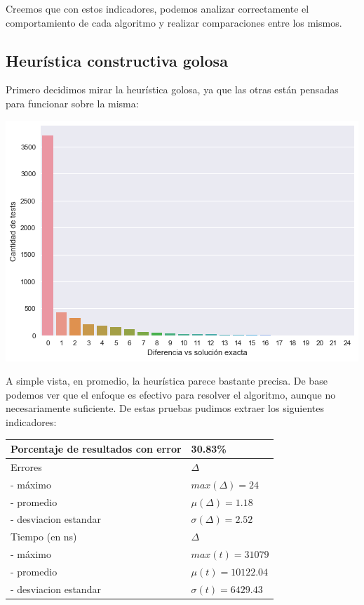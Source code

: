 Creemos que con estos indicadores, podemos analizar correctamente el comportamiento de cada algoritmo y realizar comparaciones entre los mismos.

\subsection*{Heurística constructiva golosa}

Primero decidimos mirar la heurística golosa, ya que las otras están pensadas para funcionar sobre la misma:

\begin{center}
    \includegraphics[scale=0.6]{img/accuracy-greedy.png}
\end{center}

A simple vista, en promedio, la heurística parece bastante precisa. De base podemos ver que el enfoque es efectivo para resolver el algoritmo, aunque no necesariamente suficiente. De estas pruebas pudimos extraer los siguientes indicadores:

\begin{center}
    \begin{tabular}{ | l l |}
        \hline
        Porcentaje de resultados con error & 30.83\% \\ \hline
        Errores & $\Delta$ \\
        - máximo & $max(\Delta) = 24$ \\
        - promedio & $\mu(\Delta) = 1.18$ \\
        - desviacion estandar & $\sigma(\Delta) = 2.52$ \\ \hline
        Tiempo (en ns) & $\Delta$ \\
        - máximo & $max(t) = 31079 $ \\
        - promedio & $\mu(t) = 10122.04$ \\
        - desviacion estandar & $\sigma(t) = 6429.43$ \\
        \hline
    \end{tabular}
\end{center}

